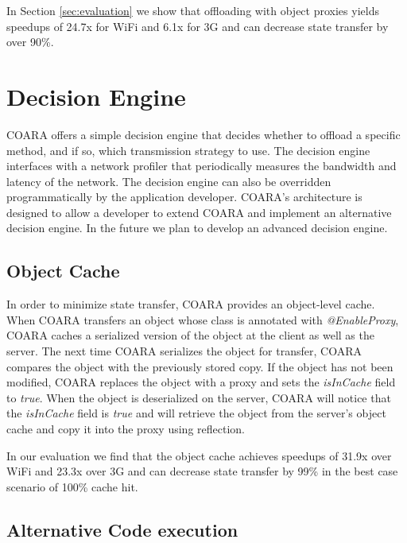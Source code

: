 \documentclass[10pt,journal,cspaper,compsoc]{IEEEtran}
\begin{document}
In Section \ref{sec:evaluation} we show that offloading with object proxies yields speedups of 24.7x for WiFi and 6.1x for 3G and can decrease state transfer by over 90\%.





\section{Decision Engine \label{section.serialization}}


COARA offers a simple decision engine that decides whether to offload a specific method, and if so, which transmission strategy to use.  The decision engine interfaces with a network profiler that periodically measures the bandwidth and latency of the network.  The decision engine can also be overridden programmatically by the application developer.  COARA's architecture is designed to allow a developer to extend COARA and implement an alternative decision engine.  In the future we plan to develop an advanced decision engine.



\subsection{Object Cache \label{section.cache}}


In order to minimize state transfer, COARA provides an object-level cache.  When COARA transfers an object whose class is annotated with \emph{@EnableProxy}, COARA caches a serialized version of the object at the client as well as the server.  The next time COARA serializes the object for transfer, COARA compares the object with the previously stored copy.  If the object has not been modified, COARA replaces the object with a proxy and sets the \emph{isInCache} field to \emph{true}.  When the object is deserialized on the server, COARA will notice that the \emph{isInCache} field is \emph{true} and will retrieve the object from the server's object cache and copy it into the proxy using reflection.

In our evaluation we find that the object cache achieves speedups of 31.9x over WiFi and 23.3x over 3G and can decrease state transfer by 99\% in the best case scenario of 100\% cache hit.


\subsection{Alternative Code execution\label{section.alternative_code_execution}}
\end{document}
